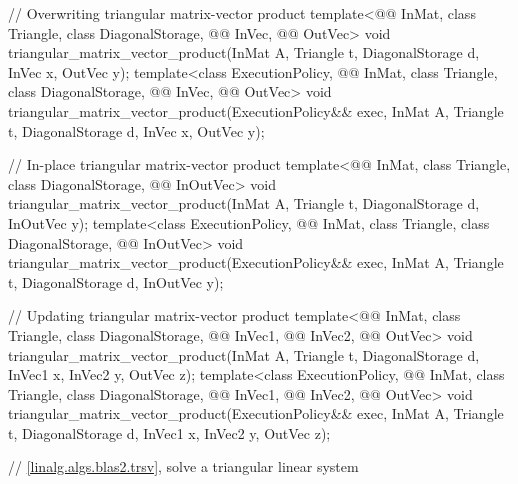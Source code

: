 \begin{codeblock}
{  // Overwriting triangular matrix-vector product
  template<@@ InMat, class Triangle, class DiagonalStorage, @@ InVec,
           @@ OutVec>
    void triangular_matrix_vector_product(InMat A, Triangle t, DiagonalStorage d,
                                          InVec x, OutVec y);
  template<class ExecutionPolicy,
           @@ InMat, class Triangle, class DiagonalStorage, @@ InVec,
           @@ OutVec>
    void triangular_matrix_vector_product(ExecutionPolicy&& exec,
                                          InMat A, Triangle t, DiagonalStorage d,
                                          InVec x, OutVec y);

  // In-place triangular matrix-vector product
  template<@@ InMat, class Triangle, class DiagonalStorage, @@ InOutVec>
    void triangular_matrix_vector_product(InMat A, Triangle t, DiagonalStorage d, InOutVec y);
  template<class ExecutionPolicy,
           @@ InMat, class Triangle, class DiagonalStorage, @@ InOutVec>
    void triangular_matrix_vector_product(ExecutionPolicy&& exec,
                                          InMat A, Triangle t, DiagonalStorage d, InOutVec y);

  // Updating triangular matrix-vector product
  template<@@ InMat, class Triangle, class DiagonalStorage,
           @@ InVec1, @@ InVec2, @@ OutVec>
    void triangular_matrix_vector_product(InMat A, Triangle t, DiagonalStorage d,
                                          InVec1 x, InVec2 y, OutVec z);
  template<class ExecutionPolicy, @@ InMat, class Triangle, class DiagonalStorage,
           @@ InVec1, @@ InVec2, @@ OutVec>
    void triangular_matrix_vector_product(ExecutionPolicy&& exec,
                                          InMat A, Triangle t, DiagonalStorage d,
                                          InVec1 x, InVec2 y, OutVec z);

  // \ref{linalg.algs.blas2.trsv}, solve a triangular linear system

}
\end{codeblock}
